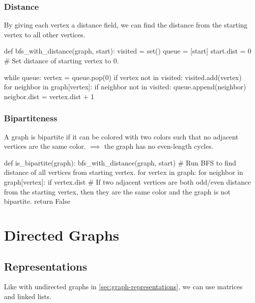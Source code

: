 
\subsubsection{Distance}
By giving each vertex a distance field, we can find the distance from the starting vertex to all other vertices.

\begin{python}
def bfs_with_distance(graph, start):
    visited = set()
    queue = [start]
    start.dist = 0 # Set distance of starting vertex to 0.

    while queue:
        vertex = queue.pop(0)
        if vertex not in visited:
            visited.add(vertex)
            for neighbor in graph[vertex]:
                if neighbor not in visited:
                    queue.append(neighbor)
                    neigbor.dist = vertex.dist + 1

\end{python}


\subsubsection{Bipartiteness}
A graph is bipartite if it can be colored with two colors such that no adjacent vertices are the same color.
$\implies$ the graph has no even-length cycles.

\begin{python}
def is_bipartite(graph):
    bfs_with_distance(graph, start) 
    # Run BFS to find distance of all vertices from starting vertex.
    for vertex in graph:
        for neighbor in graph[vertex]:
            if vertex.dist %
                # If two adjacent vertices are both odd/even distance from the starting vertex, then they are the same color and the graph is not bipartite.
                return False
\end{python}


\section{Directed Graphs}

\subsection{Representations}
Like with undirected graphs in \ref{sec:graph-representations}, we can use matrices and linked lists. 

